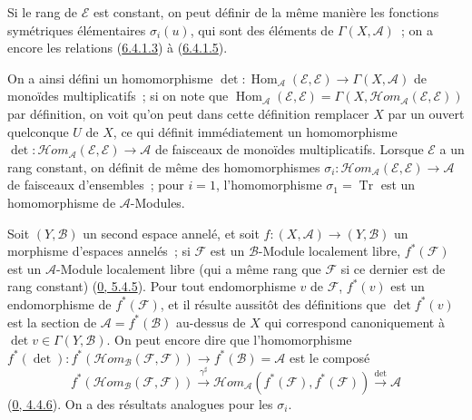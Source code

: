 \begin{env}[6.4.8]
Si le rang de $\mathcal{E}$ est constant, on peut définir de la même manière
les fonctions symétriques élémentaires $\sigma_i(u)$, qui sont des éléments
de $\Gamma(X,\mathcal{A})$~; on a encore les relations
(\hyperref[II.6.4.1.3-fr]{6.4.1.3}) à
(\hyperref[II.6.4.1.5-fr]{6.4.1.5}).


On a ainsi défini un homomorphisme
$\det:\operatorname{Hom}_{\mathcal{A}}(\mathcal{E},\mathcal{E})
\to\Gamma(X,\mathcal{A})$ de monoïdes multiplicatifs~; si on note que
$\operatorname{Hom}_{\mathcal{A}}(\mathcal{E},\mathcal{E})=
\Gamma(X,\mathcal{H}om_{\mathcal{A}}(\mathcal{E},\mathcal{E}))$ par
définition, on voit qu'on peut dans cette définition remplacer $X$ par un
ouvert quelconque $U$ de $X$, ce qui définit immédiatement un homomorphisme
$\det:\mathcal{H}om_{\mathcal{A}}(\mathcal{E},\mathcal{E})\to\mathcal{A}$ de
faisceaux de monoïdes multiplicatifs. Lorsque $\mathcal{E}$ a un rang
constant, on définit de même des homomorphismes
$\sigma_i:\mathcal{H}om_{\mathcal{A}}(\mathcal{E},\mathcal{E})
\to\mathcal{A}$ de faisceaux d'ensembles~; pour $i=1$, l'homomorphisme
$\sigma_1=\operatorname{Tr}$ est un homomorphisme de $\mathcal{A}$-Modules.

Soit $(Y,\mathcal{B})$ un second espace annelé, et soit
$f:(X,\mathcal{A})\to(Y,\mathcal{B})$ un morphisme d'espaces annelés~; si
$\mathcal{F}$ est un $\mathcal{B}$-Module localement libre,
$f^*(\mathcal{F})$ est un $\mathcal{A}$-Module localement libre (qui a même
rang que $\mathcal{F}$ si ce dernier est de rang constant)
(\hyperref[0.5.4.5-fr]{0, 5.4.5}). Pour tout endomorphisme $v$ de
$\mathcal{F}$, $f^*(v)$ est un endomorphisme de $f^*(\mathcal{F})$, et il
résulte aussitôt des définitions que $\det f^*(v)$ est la section de
$\mathcal{A}=f^*(\mathcal{B})$ au-dessus de $X$ qui correspond canoniquement
à $\det v\in\Gamma(Y,\mathcal{B})$. On peut encore dire que l'homomorphisme
$f^*(\det):f^*(\mathcal{H}om_{\mathcal{B}}(\mathcal{F},\mathcal{F}))
\to f^*(\mathcal{B})=\mathcal{A}$ est le composé
\[
f^*(\mathcal{H}om_{\mathcal{B}}(\mathcal{F},\mathcal{F}))
\xrightarrow{\gamma^\sharp}
\mathcal{H}om_{\mathcal{A}}(f^*(\mathcal{F}),f^*(\mathcal{F}))
\xrightarrow{\det}\mathcal{A}
\]
(\hyperref[0.4.4.6-fr]{0, 4.4.6}). On a des résultats analogues pour les
$\sigma_i$.
\end{env}

